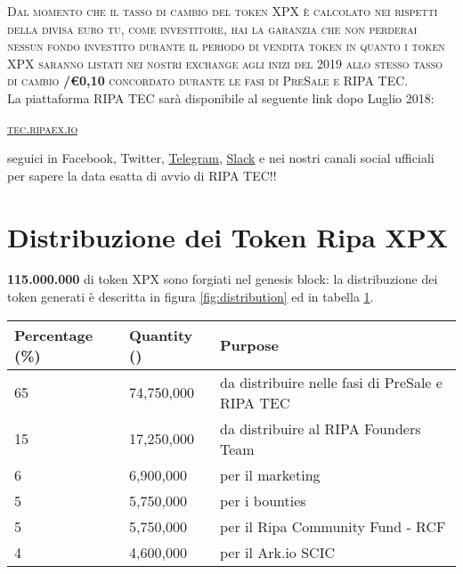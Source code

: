 \documentclass[11pt,fleqn]{book} %
\begin{document}
\textsc{Dal momento che il tasso di cambio del token XPX è calcolato nei rispetti della divisa euro tu, come investitore,
hai la garanzia che non perderai nessun fondo investito durante il periodo di vendita token in quanto i token XPX
saranno listati nei nostri exchange agli inizi del 2019 allo stesso tasso di cambio \textbf{\PHP/\euro0,10} 
concordato durante le fasi di PreSale e RIPA TEC}.\\

La piattaforma RIPA TEC sarà disponibile al seguente link dopo Luglio 2018:
\begin{center}
	\href{https://tex.ripaex.io}{\textsc{tec.ripaex.io}}
\end{center}
seguici in Facebook, Twitter, 
\href{https://t.me/ripaex}{Telegram}, 
\href{https://join.slack.com/t/ripaex/shared_invite/enQtMzM4NzUwNjU4OTQ0LTY3MDJmMTdhYTNlZjJlNGUxNzM1YjUwYjgyYjZlMDJmOTg3NTIzNThmNTYyMGQ3ODBkOTRmYzk3Y2Y4MzBkOTY}{Slack}
e nei nostri canali social ufficiali per sapere la data esatta di avvio di
RIPA TEC!!

\section{Distribuzione dei Token Ripa XPX}
\textbf{115.000.000} di token XPX sono forgiati nel genesis block: la distribuzione dei token generati è descritta
in figura \ref{fig:distribution} ed in tabella \ref{tab:distribution}.

\vspace{5mm}
	\label{fig:distribution}

\vspace{5mm}
\begin{table}[H]
	\centering
	\begin{tabular}{l l l}
		\toprule
		\textbf{Percentage (\%)} & \textbf{Quantity (\PHP)} & \textbf{Purpose} \\
		\midrule
		65		& 74,750,000	& da distribuire nelle fasi di PreSale e RIPA TEC	\\
		15      & 17,250,000	& da distribuire al RIPA Founders Team	\\
		6       & 6,900,000		& per il marketing	\\
		5       & 5,750,000 	& per i bounties	\\
		5       & 5,750,000		& per il Ripa Community Fund - RCF	\\
		4       & 4,600,000		& per il Ark.io SCIC \\
		\bottomrule
	\end{tabular}
	\label{tab:distribution}
\end{table}
\end{document}
